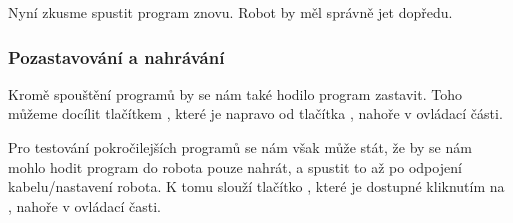 \documentclass[main.tex]{subfiles}
\begin{document}
	\begin{figure}[h!]%
		\begin{subfigure}{.49\textwidth}%
			\centering%
		\end{subfigure} \hspace{.05\textwidth}%
		\begin{subfigure}{.49\textwidth}%
			\centering%
		\end{subfigure}%
	\end{figure}

	Nyní zkusme spustit program znovu. Robot by měl správně jet dopředu.

	\subsubsection{Pozastavování a nahrávání}
	Kromě spouštění programů by se nám také hodilo program zastavit. Toho můžeme docílit tlačítkem , které je napravo od tlačítka , nahoře v ovládací části.

	Pro testování pokročilejších programů se nám však může stát, že by se nám mohlo hodit program do robota pouze nahrát, a spustit to až po odpojení kabelu/nastavení robota. K tomu slouží tlačítko , které je dostupné kliknutím na , nahoře v ovládací časti.
\end{document}
